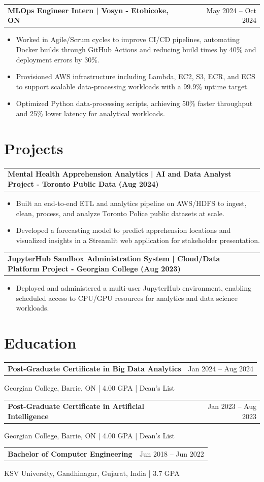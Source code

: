 \documentclass[10.5pt,letterpaper]{article}
\makeatletter
\newcommand{\resumeRow}[2]{%
  \noindent\begin{tabularx}{\linewidth}{@{}X r@{}}
    \textbf{#1} & #2 \\
  \end{tabularx}%
}
\makeatother
\begin{document}
\resumeRow{MLOps Engineer Intern | Vosyn - Etobicoke, ON}{May 2024 -- Oct 2024}
\begin{itemize}
  \item Worked in Agile/Scrum cycles to improve CI/CD pipelines, automating Docker builds through GitHub Actions and reducing build times by 40\% and deployment errors by 30\%.
  \item Provisioned AWS infrastructure including Lambda, EC2, S3, ECR, and ECS to support scalable data-processing workloads with a 99.9\% uptime target.
  \item Optimized Python data-processing scripts, achieving 50\% faster throughput and 25\% lower latency for analytical workloads.
\end{itemize}

\section{Projects}
\resumeRow{Mental Health Apprehension Analytics | AI and Data Analyst Project - Toronto Public Data (Aug 2024)}{}
\begin{itemize}
  \item Built an end-to-end ETL and analytics pipeline on AWS/HDFS to ingest, clean, process, and analyze Toronto Police public datasets at scale.
  \item Developed a forecasting model to predict apprehension locations and visualized insights in a Streamlit web application for stakeholder presentation.
\end{itemize}
\resumeRow{JupyterHub Sandbox Administration System | Cloud/Data Platform Project - Georgian College (Aug 2023)}{}
\begin{itemize}
  \item Deployed and administered a multi-user JupyterHub environment, enabling scheduled access to CPU/GPU resources for analytics and data science workloads.
\end{itemize}

\section{Education}
\resumeRow{Post-Graduate Certificate in Big Data Analytics}{Jan 2024 -- Aug 2024}
{\small Georgian College, Barrie, ON | 4.00 GPA | Dean's List}\\[2pt]\resumeRow{Post-Graduate Certificate in Artificial Intelligence}{Jan 2023 -- Aug 2023}
{\small Georgian College, Barrie, ON | 4.00 GPA | Dean's List}\\[2pt]\resumeRow{Bachelor of Computer Engineering}{Jun 2018 -- Jun 2022}
{\small KSV University, Gandhinagar, Gujarat, India | 3.7 GPA}
\end{document}

